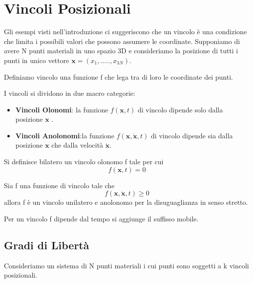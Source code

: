 \section{Vincoli Posizionali}

Gli esempi visti nell'introduzione ci suggeriscono che un vincolo \`{e} una condizione che limita i possibili valori che possono assumere le coordinate. Supponiamo di avere N punti materiali in uno spazio 3D e consideriamo la posizione di tutti i punti in unico vettore 
$\bm{x} = (x_1,.....,x_{3N})$.

\begin{definition}
	 Definiamo vincolo una funzione f che lega tra di loro le coordinate dei punti.
\end{definition}
\noindent I vincoli si dividono in due macro categorie:
\begin{itemize}
	\item \textbf{Vincoli Olonomi}: la funzione $f(\bm{x},t)$ di vincolo dipende solo dalla posizione $\bm{x}$ .
	\item \textbf{Vincoli Anolonomi}:la funzione $f(\bm{x},\dot{\bm{x}},t)$ di vincolo dipende sia dalla posizione $\bm{x}$ che dalla velocit\`{a} $\dot{\bm{x}}$.
\end{itemize}

\begin{definition}
	Si definisce bilatero un vincolo olonomo f tale per cui 
	\begin{equation}
		f(\bm{x},t) = 0
	\end{equation}
\end{definition}
\begin{definition}
	Sia f una funzione di vincolo tale che 
	\begin{equation}
		f(\bm{x},\dot{\bm{x}},t) \geq 0
	\end{equation}
allora f \`{e} un vincolo unilatero e anolonomo per la disuguaglianza in senso stretto.
\end{definition}

\begin{definition}
	Per un vincolo f dipende dal tempo si aggiunge il suffisso mobile.
\end{definition}

\subsection{Gradi di Libert\`{a}}
Consideriamo un sistema di N punti materiali i cui punti sono soggetti a k vincoli posizionali.

